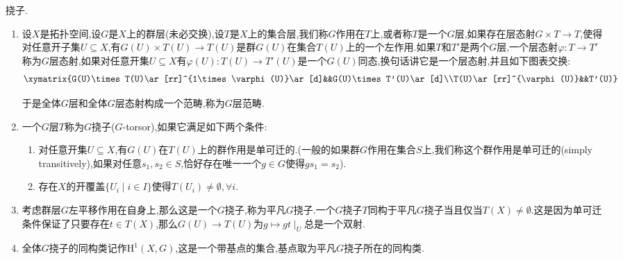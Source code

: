 挠子.
\begin{enumerate}
	\item 设$X$是拓扑空间,设$G$是$X$上的群层(未必交换),设$T$是$X$上的集合层,我们称$G$作用在$T$上,或者称$T$是一个$G$层,如果存在层态射$G\times T\to T$,使得对任意开子集$U\subseteq X$,有$G(U)\times T(U)\to T(U)$是群$G(U)$在集合$T(U)$上的一个左作用.如果$T$和$T'$是两个$G$层,一个层态射$\varphi:T\to T'$称为$G$层态射,如果对任意开集$U\subseteq X$有$\varphi(U):T(U)\to T'(U)$是一个$G(U)$同态,换句话讲它是一个层态射,并且如下图表交换:
	$$\xymatrix{G(U)\times T(U)\ar[rr]^{1\times\varphi(U)}\ar[d]&&G(U)\times T'(U)\ar[d]\\T(U)\ar[rr]^{\varphi(U)}&&T'(U)}$$
	
	于是全体$G$层和全体$G$层态射构成一个范畴,称为$G$层范畴.
	\item 一个$G$层$T$称为$G$挠子($G$-torsor),如果它满足如下两个条件:
	\begin{enumerate}
		\item 对任意开集$U\subseteq X$,有$G(U)$在$T(U)$上的群作用是单可迁的.(一般的如果群$G$作用在集合$S$上,我们称这个群作用是单可迁的(simply transitively),如果对任意$s_1,s_2\in S$,恰好存在唯一一个$g\in G$使得$gs_1=s_2$).
		\item 存在$X$的开覆盖$\{U_i\mid i\in I\}$使得$T(U_i)\not=\emptyset,\forall i$.
	\end{enumerate}
	\item 考虑群层$G$左平移作用在自身上,那么这是一个$G$挠子,称为平凡$G$挠子.一个$G$挠子$T$同构于平凡$G$挠子当且仅当$T(X)\not=\emptyset$.这是因为单可迁条件保证了只要存在$t\in T(X)$,那么$G(U)\to T(U)$为$g\mapsto gt\mid_U$总是一个双射.
	\item 全体$G$挠子的同构类记作$\mathrm{H}^1(X,G)$,这是一个带基点的集合,基点取为平凡$G$挠子所在的同构类.
\end{enumerate}

